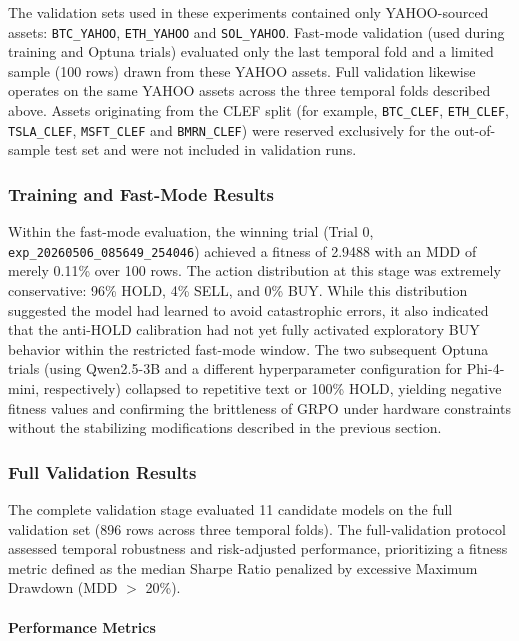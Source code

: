     The validation sets used in these experiments contained only YAHOO-sourced assets: \texttt{BTC\_YAHOO}, \texttt{ETH\_YAHOO} and \texttt{SOL\_YAHOO}. Fast-mode validation (used during training and Optuna trials) evaluated only the last temporal fold and a limited sample (100 rows) drawn from these YAHOO assets. Full validation likewise operates on the same YAHOO assets across the three temporal folds described above. Assets originating from the CLEF split (for example, \texttt{BTC\_CLEF}, \texttt{ETH\_CLEF}, \texttt{TSLA\_CLEF}, \texttt{MSFT\_CLEF} and \texttt{BMRN\_CLEF}) were reserved exclusively for the out-of-sample test set and were not included in validation runs.

    \subsubsection{Training and Fast-Mode Results}

    Within the fast-mode evaluation, the winning trial (Trial 0, \texttt{exp\_20260506\_085649\_254046}) achieved a fitness of 2.9488 with an MDD of merely 0.11\% over 100 rows. The action distribution at this stage was extremely conservative: 96\% HOLD, 4\% SELL, and 0\% BUY. While this distribution suggested the model had learned to avoid catastrophic errors, it also indicated that the anti-HOLD calibration had not yet fully activated exploratory BUY behavior within the restricted fast-mode window. The two subsequent Optuna trials (using Qwen2.5-3B and a different hyperparameter configuration for Phi-4-mini, respectively) collapsed to repetitive text or 100\% HOLD, yielding negative fitness values and confirming the brittleness of GRPO under hardware constraints without the stabilizing modifications described in the previous section.

    \subsubsection{Full Validation Results}
    The complete validation stage evaluated 11 candidate models on the full validation set (896 rows across three temporal folds). The full-validation protocol assessed temporal robustness and risk-adjusted performance, prioritizing a fitness metric defined as the median Sharpe Ratio penalized by excessive Maximum Drawdown (MDD $>$ 20\%).

    \paragraph{Performance Metrics}
    
